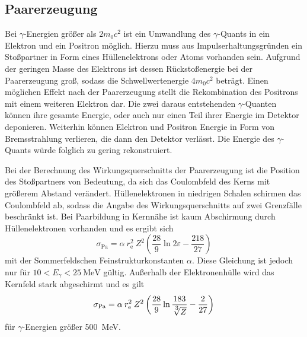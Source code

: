 \subsection{Paarerzeugung}
\label{sec:Paarerzeugung}

Bei $\gamma$-Energien größer als $2 m_0 c^2$ ist ein Umwandlung des $\gamma$-Quants in ein
Elektron und ein Positron möglich.
Hierzu muss aus Impulserhaltungsgründen ein Stoßpartner in Form eines Hüllenelektrons
oder Atoms vorhanden sein.
Aufgrund der geringen Masse des Elektrons ist dessen Rückstoßenergie
bei der Paarerzeugung groß, sodass die Schwellwertenergie $4 m_0 c^2$ beträgt.
Einen möglichen Effekt nach der Paarerzeugung stellt die Rekombination des Positrons
mit einem weiteren Elektron dar. Die zwei daraus entstehenden $\gamma$-Quanten können
ihre gesamte Energie, oder auch nur einen Teil ihrer Energie im Detektor deponieren.
Weiterhin können Elektron und Positron Energie in Form von Bremsstrahlung verlieren, die dann
den Detektor verlässt.
Die Energie des $\gamma$-Quants würde folglich zu gering rekonstruiert.

Bei der Berechnung des Wirkungsquerschnitts der Paarerzeugung ist die Position des Stoßpartners
von Bedeutung, da sich das Coulombfeld des Kerns mit größerem Abstand verändert.
Hüllenelektronen in niedrigen Schalen schirmen das Coulombfeld ab, sodass die
Angabe des Wirkungsquerschnitts auf zwei Grenzfälle beschränkt ist.
Bei Paarbildung in Kernnähe ist kaum Abschirmung durch Hüllenelektronen vorhanden
und es ergibt sich
\begin{equation*}
	\sigma_\text{Pa} = \alpha\:r_\text{e}^2\:Z^2
	\left(\frac{28}{9} \ln2\varepsilon - \frac{218}{27}\right)
\end{equation*}
mit der Sommerfeldschen Feinstrukturkonstanten $\alpha$.
Diese Gleichung ist jedoch nur für $10 < E_\gamma < \SI{25}{\mega\electronvolt}$ gültig.
Außerhalb der Elektronenhülle wird das Kernfeld stark abgeschirmt und es gilt
\begin{equation*}
	\sigma_\text{Pa} = \alpha\:r_\text{e}^2\:Z^2
	\left(\frac{28}{9} \ln\frac{183}{\sqrt[\leftroot{-1}\uproot{2}\scriptstyle 3]Z} - \frac{2}{27}\right)
\end{equation*}
für $\gamma$-Energien größer \SI{500}{\mega\electronvolt}.

